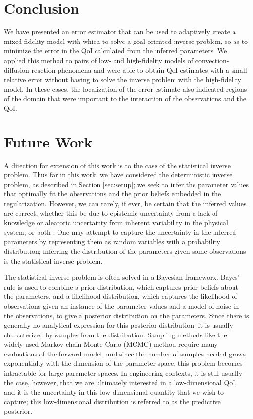 \section{Conclusion}\label{sect:conc}

We have presented an error estimator that can be used to adaptively create a mixed-fidelity model with which to solve a goal-oriented inverse problem, so as to minimize the error in the QoI calculated from the inferred parameters. We applied this method to pairs of low- and high-fidelity models of convection-diffusion-reaction phenomena and were able to obtain QoI estimates with a small relative error without having to solve the inverse problem with the high-fidelity model. In these cases, the localization of the error estimate also indicated regions of the domain that were important to the interaction of the observations and the QoI.

\section{Future Work} 

A direction for extension of this work is to the case of the statistical inverse problem. Thus far in this work, we have considered the deterministic inverse problem, as described in Section \ref{sec:setup}; we seek to infer the parameter values that optimally fit the observations and the prior beliefs embedded in the regularization. However, we can rarely, if ever, be certain that the inferred values are correct, whether this be due to epistemic uncertainty from a lack of knowledge or aleatoric uncertainty from inherent variability in the physical system, or both \cite{Ober04}. One may attempt to capture the uncertainty in the inferred parameters by representing them as random variables with a probability distribution; inferring the distribution of the parameters given some observations is the statistical inverse problem. 

The statistical inverse problem is often solved in a Bayesian framework. Bayes' rule is used to combine a prior distribution, which captures prior beliefs about the parameters, and a likelihood distribution, which captures the likelihood of observations given an instance of the parameter values and a model of noise in the observations, to give a posterior distribution on the parameters. Since there is generally no analytical expression for this posterior distribution, it is usually characterized by samples from the distribution. Sampling methods like the widely-used Markov chain Monte Carlo (MCMC) method require many evaluations of the forward model, and since the number of samples needed grows exponentially with the dimension of the parameter space, this problem becomes intractable for large parameter spaces. In engineering contexts, it is still usually the case, however, that we are ultimately interested in a low-dimensional QoI, and it is the uncertainty in this low-dimensional quantity that we wish to capture; this low-dimensional distribution is referred to as the predictive posterior.

